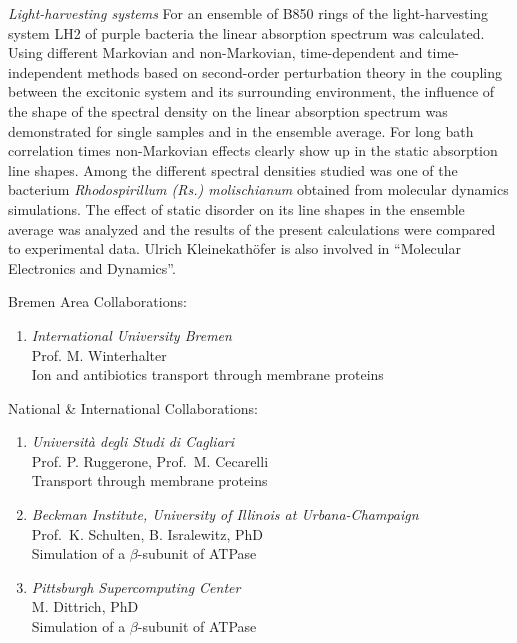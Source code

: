 \emph{Light-harvesting systems} For an ensemble of B850 rings of the
light-harvesting system LH2 of purple bacteria the linear absorption
spectrum was calculated. Using different Markovian and non-Markovian,
time-dependent and time-independent methods based on second-order
perturbation theory in the coupling between the excitonic system and its
surrounding environment, the influence of the shape of the spectral density
on the linear absorption spectrum was demonstrated for single samples and
in the ensemble average.  For long bath correlation times non-Markovian
effects clearly show up in the static absorption line shapes. Among the
different spectral densities studied was one of the bacterium
\emph{Rhodospirillum (Rs.) molischianum} obtained from molecular dynamics
simulations.  The effect of static disorder on its line shapes in the
ensemble average was analyzed and the results of the present calculations
were compared to experimental data.  \newline \newline Ulrich
Kleinekath\"ofer is also involved in ``Molecular Electronics and Dynamics''.

%
Bremen Area Collaborations:
\begin{enumerate}
\item {\sl International University Bremen} \\ Prof. M. Winterhalter
  \\ Ion and antibiotics transport through membrane proteins
  \end{enumerate}
National \& International Collaborations:
\begin{enumerate}
\item {\sl Universit\`a degli Studi di Cagliari} \\ Prof. P. Ruggerone,
  Prof.\ M. Cecarelli
  \\ Transport through membrane proteins
\item {\sl Beckman Institute, University of Illinois at Urbana-Champaign}
  \\ Prof.\ K. Schulten,  B. Isralewitz, PhD
\\ Simulation of a $\beta$-subunit of ATPase
\item {\sl Pittsburgh Supercomputing Center}
  \\ M. Dittrich, PhD \\ Simulation of a $\beta$-subunit of ATPase
\end{enumerate}



